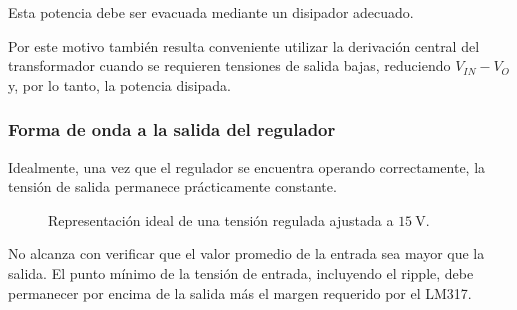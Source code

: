 \documentclass[12pt,a4paper]{article}
\begin{document}
	Esta potencia debe ser evacuada mediante un disipador adecuado.
	
	Por este motivo también resulta conveniente utilizar la derivación central del
	transformador cuando se requieren tensiones de salida bajas, reduciendo
	$V_{IN}-V_O$ y, por lo tanto, la potencia disipada.
	
	\subsubsection{Forma de onda a la salida del regulador}
	
	Idealmente, una vez que el regulador se encuentra operando correctamente, la
	tensión de salida permanece prácticamente constante.
	
	\begin{figure}[H]
		\centering
		
		
		\caption{Representación ideal de una tensión regulada ajustada a
			$15~\text{V}$.}
		\label{fig:salida_regulada}
		
	\end{figure}
	
	\begin{tcolorbox}[
		colback=gray!5,
		colframe=black!50,
		title=Punto importante
		]
		No alcanza con verificar que el valor promedio de la entrada sea mayor que la
		salida. El punto mínimo de la tensión de entrada, incluyendo el ripple, debe
		permanecer por encima de la salida más el margen requerido por el LM317.
	\end{tcolorbox}
	
\end{document}
